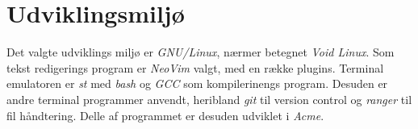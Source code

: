 \section{Udviklingsmilj{\o}}
\label{sec:Udviklingsmiljo}
Det valgte udviklings milj{\o} er \textit{GNU/Linux}, n{\ae}rmer betegnet \textit{Void Linux}. Som tekst redigerings program er \textit{NeoVim} valgt, med en r{\ae}kke plugins. Terminal emulatoren er \textit{st} med \textit{bash} og \textit{GCC} som kompilerinengs program. Desuden er andre terminal programmer anvendt, heribland \textit{git} til version control og \textit{ranger} til fil h{\aa}ndtering. Delle af programmet er desuden udviklet i \textit{Acme}.